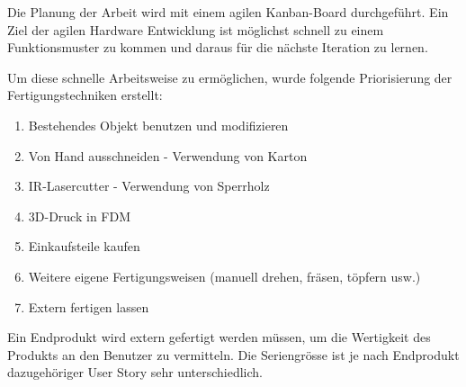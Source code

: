 

Die Planung der Arbeit wird mit einem agilen Kanban-Board durchgeführt. Ein Ziel der agilen Hardware Entwicklung ist möglichst schnell zu einem Funktionsmuster zu kommen und daraus für die nächste Iteration zu lernen.

Um diese schnelle Arbeitsweise zu ermöglichen, wurde folgende Priorisierung der Fertigungstechniken erstellt:

\begin{enumerate}
\item Bestehendes Objekt benutzen und modifizieren
\item Von Hand ausschneiden - Verwendung von Karton
\item IR-Lasercutter - Verwendung von Sperrholz
\item 3D-Druck in FDM
\item Einkaufsteile kaufen
\item Weitere eigene Fertigungsweisen (manuell drehen, fräsen, töpfern usw.)
\item Extern fertigen lassen
\end{enumerate}

Ein Endprodukt wird extern gefertigt werden müssen, um die Wertigkeit des Produkts an den Benutzer zu vermitteln. Die Seriengrösse ist je nach Endprodukt dazugehöriger User Story sehr unterschiedlich.
